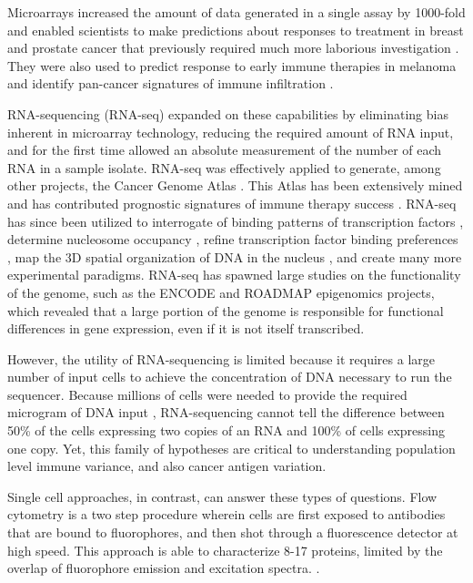 Microarrays increased the amount of data generated in a single assay by 1000-fold and enabled scientists to make predictions about responses to treatment in breast and prostate cancer that previously required much more laborious investigation \citep{Glinsky2004, VantVeer2002}. 
They were also used to predict response to early immune therapies in melanoma \citep{Monsurro2004} and identify pan-cancer signatures of immune infiltration \citep{Chifman2016}.

RNA-sequencing (RNA-seq) expanded on these capabilities by eliminating bias inherent in microarray technology, reducing the required amount of RNA input, and for the first time allowed an absolute measurement of the number of each RNA in a sample isolate.
RNA-seq was effectively applied to generate, among other projects, the Cancer Genome Atlas \citep{McLendon2008,Network2011}.
This Atlas has been extensively mined and has contributed prognostic signatures of immune therapy success \citep{Senbabaoglu2016}.
RNA-seq has since been utilized to interrogate of binding patterns of transcription factors \citep{Johnson2007}, determine nucleosome occupancy \citep{Boyle2008}, refine transcription factor binding preferences \citep{Riley2014}, map the 3D spatial organization of DNA in the nucleus \citep{Belton2012}, and create many more experimental paradigms.
RNA-seq has spawned large studies on the functionality of the genome, such as the ENCODE and ROADMAP epigenomics projects, which revealed that a large portion of the genome is responsible for functional differences in gene expression, even if it is not itself transcribed. %

However, the utility of RNA-sequencing is limited because it requires a large number of input cells to achieve the concentration of DNA necessary to run the sequencer.
Because millions of cells were needed to provide the required microgram of DNA input \citep{Wilhelm2009}, RNA-sequencing cannot tell the difference between 50\% of the cells expressing two copies of an RNA and 100\% of cells expressing one copy. 
Yet, this family of hypotheses are critical to understanding population level immune variance, and also cancer antigen variation. 

Single cell approaches, in contrast, can answer these types of questions. 
Flow cytometry is a two step procedure wherein cells are first exposed to antibodies that are bound to fluorophores, and then shot through a fluorescence detector at high speed. 
This approach is able to characterize 8-17 proteins, limited by the overlap of fluorophore emission and excitation spectra. \citep{Perfetto2004}.

